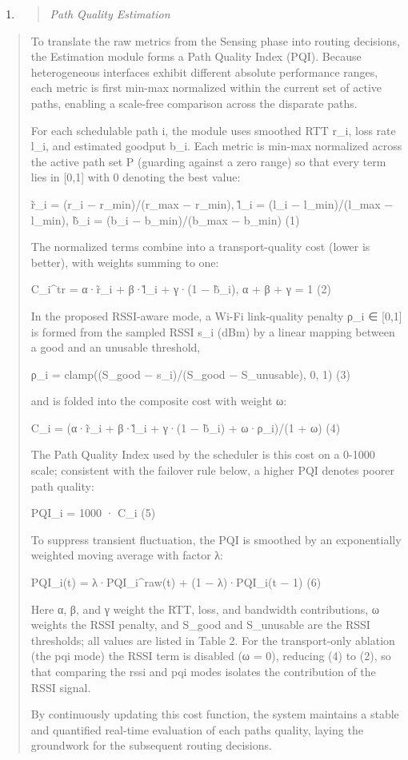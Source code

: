 \begin{enumerate}
\def\labelenumi{\arabic{enumi}.}
\setcounter{enumi}{2}
\item
  \begin{quote}
  \emph{Path Quality Estimation}
  \end{quote}
\end{enumerate}

\begin{quote}
To translate the raw metrics from the Sensing phase into routing decisions, the Estimation module forms a Path Quality Index (PQI). Because heterogeneous interfaces exhibit different absolute performance ranges, each metric is first min-max normalized within the current set of active paths, enabling a scale-free comparison across the disparate paths.

For each schedulable path i, the module uses smoothed RTT r\_i, loss rate l\_i, and estimated goodput b\_i. Each metric is min-max normalized across the active path set P (guarding against a zero range) so that every term lies in {[}0,1{]} with 0 denoting the best value:

r̃\_i = (r\_i − r\_min)/(r\_max − r\_min), l̃\_i = (l\_i − l\_min)/(l\_max − l\_min), b̃\_i = (b\_i − b\_min)/(b\_max − b\_min) (1)

The normalized terms combine into a transport-quality cost (lower is better), with weights summing to one:

C\_i\^{}tr = α·r̃\_i + β·l̃\_i + γ·(1 − b̃\_i), α + β + γ = 1 (2)

In the proposed RSSI-aware mode, a Wi-Fi link-quality penalty ρ\_i ∈ {[}0,1{]} is formed from the sampled RSSI s\_i (dBm) by a linear mapping between a good and an unusable threshold,

ρ\_i = clamp((S\_good − s\_i)/(S\_good − S\_unusable), 0, 1) (3)

and is folded into the composite cost with weight ω:

C\_i = (α·r̃\_i + β·l̃\_i + γ·(1 − b̃\_i) + ω·ρ\_i)/(1 + ω) (4)

The Path Quality Index used by the scheduler is this cost on a 0-1000 scale; consistent with the failover rule below, a higher PQI denotes poorer path quality:

PQI\_i = 1000 · C\_i (5)

To suppress transient fluctuation, the PQI is smoothed by an exponentially weighted moving average with factor λ:

PQI\_i(t) = λ·PQI\_i\^{}raw(t) + (1 − λ)·PQI\_i(t − 1) (6)

Here α, β, and γ weight the RTT, loss, and bandwidth contributions, ω weights the RSSI penalty, and S\_good and S\_unusable are the RSSI thresholds; all values are listed in Table 2. For the transport-only ablation (the pqi mode) the RSSI term is disabled (ω = 0), reducing (4) to (2), so that comparing the rssi and pqi modes isolates the contribution of the RSSI signal.

By continuously updating this cost function, the system maintains a stable and quantified real-time evaluation of each path\textquotesingle s quality, laying the groundwork for the subsequent routing decisions.
\end{quote}

